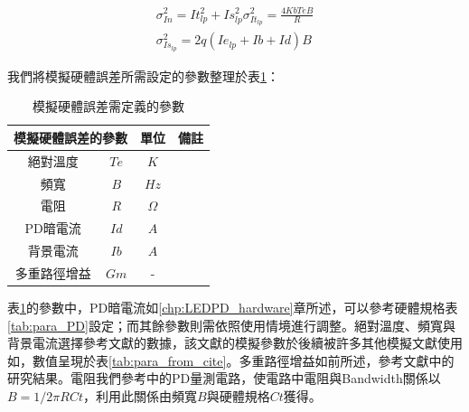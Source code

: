     \begin{gather}
        \label{eqn:thermal_noise}
        \sigma_{In}^2 = {It_{lp}^2+Is_{lp}^2}
        \sigma_{It_{lp}}^2={\frac{4 Kb Te B}{R}}\\
        \label{eqn:shot_noise}
        \sigma_{Is_{lp}}^2={2q(Ie_{lp}+Ib+Id)B}
    \end{gather}

  

    我們將模擬硬體誤差所需設定的參數整理於表\ref{tab:para_error}：

    \begin{table}[htpb]
        \renewcommand{\arraystretch}{1.3}
        \setlength{\arrayrulewidth}{0.15mm}
        \setlength{\doublerulesep}{0.12mm}
        \caption{模擬硬體誤差需定義的參數}
        \label{tab:para_error}
        \centering
        \begin{tabular}{|cc|c|c|}
        \hline
        \multicolumn{2}{|c|}{\textbf{模擬硬體誤差的參數}}  &\textbf{單位}  &  \textbf{備註}   \\
        \hline
        絕對溫度 &$Te$ & $K$ &  \\
        頻寬 &$B$ & $Hz$ &  \\
        電阻 &$R$ & $\Omega$ &  \\
        PD暗電流 &$Id$ & $A$ &  \\
        背景電流 &$Ib$ & $A$ &  \\
        多重路徑增益 &$Gm$&-&\\
        \hline
        \end{tabular}
    \end{table}


    表\ref{tab:para_error}的參數中，PD暗電流如\ref{chp:LEDPD_hardware}章所述，可以參考硬體規格表\ref{tab:para_PD}設定；而其餘參數則需依照使用情境進行調整。絕對溫度、頻寬與背景電流選擇參考文獻\cite{omg_old}的數據，該文獻的模擬參數於後續被許多其他模擬文獻使用如\cite{omg_new}，數值呈現於表\ref{tab:para_from_cite}。多重路徑增益如前所述，參考文獻\cite{multipath_new}中的研究結果。電阻我們參考\cite{hamamatsu}中的PD量測電路，使電路中電阻與Bandwidth關係以$B = 1/2\pi RCt$，利用此關係由頻寬$B$與硬體規格$Ct$獲得。


